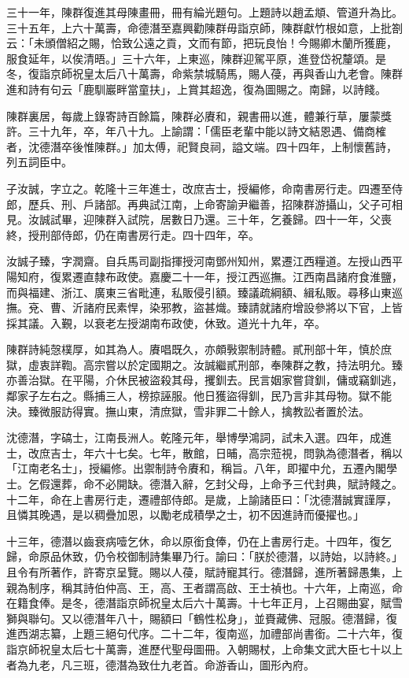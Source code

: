 \begin{pinyinscope}
三十一年，陳群復進其母陳畫冊，冊有綸光題句。上題詩以趙孟頫、管道升為比。三十五年，上六十萬壽，命德潛至嘉興勸陳群毋詣京師，陳群獻竹根如意，上批劄云：「未頒僧紹之賜，恰致公遠之貢，文而有節，把玩良怡！今賜卿木蘭所獲鹿，服食延年，以俟清晤。」三十六年，上東巡，陳群迎駕平原，進登岱祝釐頌。是冬，復詣京師祝皇太后八十萬壽，命紫禁城騎馬，賜人葠，再與香山九老會。陳群進和詩有句云「鹿馴巖畔當童扶」，上賞其超逸，復為圖賜之。南歸，以詩餞。

陳群裏居，每歲上錄寄詩百餘篇，陳群必賡和，親書冊以進，體兼行草，屢蒙獎許。三十九年，卒，年八十九。上諭謂：「儒臣老輩中能以詩文結恩遇、備商榷者，沈德潛卒後惟陳群。」加太傅，祀賢良祠，謚文端。四十四年，上制懷舊詩，列五詞臣中。

子汝誠，字立之。乾隆十三年進士，改庶吉士，授編修，命南書房行走。四遷至侍郎，歷兵、刑、戶諸部。再典試江南，上命寄諭尹繼善，招陳群游攝山，父子可相見。汝誠試畢，迎陳群入試院，居數日乃還。三十年，乞養歸。四十一年，父喪終，授刑部侍郎，仍在南書房行走。四十四年，卒。

汝誠子臻，字潤齋。自兵馬司副指揮授河南鄧州知州，累遷江西糧道。左授山西平陽知府，復累遷直隸布政使。嘉慶二十一年，授江西巡撫。江西南昌諸府食淮鹽，而與福建、浙江、廣東三省毗連，私販侵引額。臻議疏綱額、緝私販。尋移山東巡撫。兗、曹、沂諸府民素悍，染邪教，盜甚熾。臻請就諸府增設參將以下官，上皆採其議。入覲，以衰老左授湖南布政使，休致。道光十九年，卒。

陳群詩純愨樸厚，如其為人。賡唱既久，亦頗斅禦制詩體。貳刑部十年，慎於庶獄，虛衷詳鞫。高宗嘗以於定國期之。汝誠繼貳刑部，奉陳群之教，持法明允。臻亦善治獄。在平陽，介休民被盜殺其母，攫釧去。民言姻家嘗貸釧，傭或竊釧逃，鄰家子左右之。縣捕三人，榜掠誣服。他日獲盜得釧，民乃言非其母物。獄不能決。臻微服訪得實。撫山東，清庶獄，雪非罪二十餘人，擒教訟者置於法。

沈德潛，字碻士，江南長洲人。乾隆元年，舉博學鴻詞，試未入選。四年，成進士，改庶吉士，年六十七矣。七年，散館，日晡，高宗蒞視，問孰為德潛者，稱以「江南老名士」，授編修。出禦制詩令賡和，稱旨。八年，即擢中允，五遷內閣學士。乞假還葬，命不必開缺。德潛入辭，乞封父母，上命予三代封典，賦詩餞之。十二年，命在上書房行走，遷禮部侍郎。是歲，上諭諸臣曰：「沈德潛誠實謹厚，且憐其晚遇，是以稠疊加恩，以勵老成積學之士，初不因進詩而優擢也。」

十三年，德潛以齒衰病噎乞休，命以原銜食俸，仍在上書房行走。十四年，復乞歸，命原品休致，仍令校御制詩集畢乃行。諭曰：「朕於德潛，以詩始，以詩終。」且令有所著作，許寄京呈覽。賜以人葠，賦詩寵其行。德潛歸，進所著歸愚集，上親為制序，稱其詩伯仲高、王，高、王者謂高啟、王士禎也。十六年，上南巡，命在籍食俸。是冬，德潛詣京師祝皇太后六十萬壽。十七年正月，上召賜曲宴，賦雪獅與聯句。又以德潛年八十，賜額曰「鶴性松身」，並賚藏佛、冠服。德潛歸，復進西湖志纂，上題三絕句代序。二十二年，復南巡，加禮部尚書銜。二十六年，復詣京師祝皇太后七十萬壽，進歷代聖母圖冊。入朝賜杖，上命集文武大臣七十以上者為九老，凡三班，德潛為致仕九老首。命游香山，圖形內府。


\end{pinyinscope}
